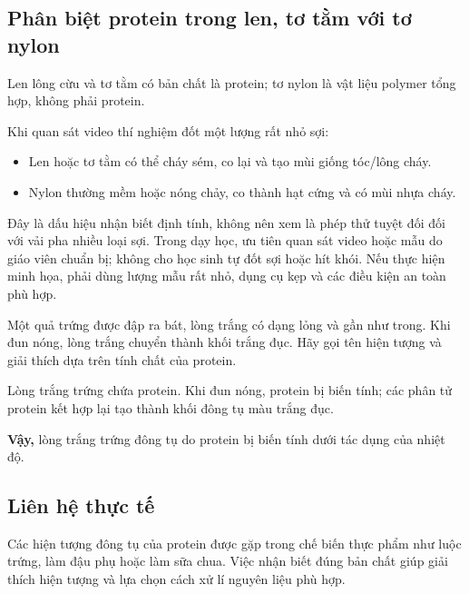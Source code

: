 \subsection{Phân biệt protein trong len, tơ tằm với tơ nylon}

Len lông cừu và tơ tằm có bản chất là protein; tơ nylon là vật liệu polymer tổng hợp, không phải protein.

Khi quan sát video thí nghiệm đốt một lượng rất nhỏ sợi:
\begin{itemize}
\item Len hoặc tơ tằm có thể cháy sém, co lại và tạo mùi giống tóc/lông cháy.
\item Nylon thường mềm hoặc nóng chảy, co thành hạt cứng và có mùi nhựa cháy.
\end{itemize}

Đây là dấu hiệu nhận biết định tính, không nên xem là phép thử tuyệt đối đối với vải pha nhiều loại sợi. Trong dạy học, ưu tiên quan sát video hoặc mẫu do giáo viên chuẩn bị; không cho học sinh tự đốt sợi hoặc hít khói. Nếu thực hiện minh họa, phải dùng lượng mẫu rất nhỏ, dụng cụ kẹp và các điều kiện an toàn phù hợp.

\begin{vidu}
Một quả trứng được đập ra bát, lòng trắng có dạng lỏng và gần như trong. Khi đun nóng, lòng trắng chuyển thành khối trắng đục. Hãy gọi tên hiện tượng và giải thích dựa trên tính chất của protein.
\end{vidu}
\begin{loigiai}
Lòng trắng trứng chứa protein. Khi đun nóng, protein bị biến tính; các phân tử protein kết hợp lại tạo thành khối đông tụ màu trắng đục.

\textbf{Vậy,} lòng trắng trứng đông tụ do protein bị biến tính dưới tác dụng của nhiệt độ.
\end{loigiai}

\subsection{Liên hệ thực tế}

Các hiện tượng đông tụ của protein được gặp trong chế biến thực phẩm như luộc trứng, làm đậu phụ hoặc làm sữa chua. Việc nhận biết đúng bản chất giúp giải thích hiện tượng và lựa chọn cách xử lí nguyên liệu phù hợp.

